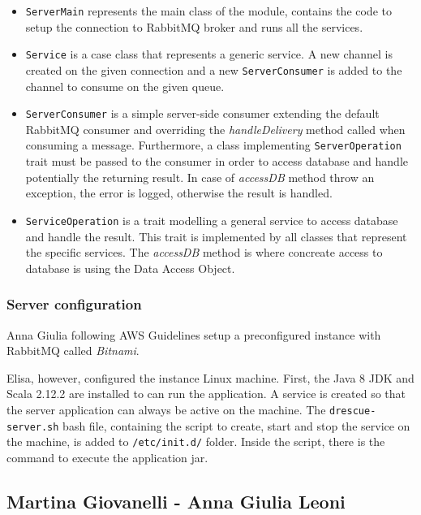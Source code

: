 \documentclass[a4paper,12pt]{report}
\begin{document}
\begin{itemize}
\item \texttt{ServerMain} represents the main class of the module, contains the code to setup the connection to RabbitMQ broker and runs all the services.
\item \texttt{Service} is a case class that represents a generic service. A new channel is created on the given connection and a new \texttt{ServerConsumer} is added to the channel to consume on the given queue.
\item \texttt{ServerConsumer} is a simple server-side consumer extending the default RabbitMQ consumer and overriding the \emph{handleDelivery} method called when consuming a message. Furthermore, a class implementing \texttt{ServerOperation} trait must be passed to the consumer in order to access database and handle potentially the returning result. In case of \emph{accessDB} method throw an exception, the error is logged, otherwise the result is handled. 
\item \texttt{ServiceOperation} is a trait modelling a general service to access database and handle the result. This trait is implemented by all classes that represent the specific services. The \emph{accessDB} method is where concreate access to database is using the Data Access Object.
\end{itemize}

\subsubsection{Server configuration}
Anna Giulia following AWS Guidelines setup a preconfigured instance with RabbitMQ called \emph{Bitnami}.

Elisa, however, configured the instance Linux machine. First, the Java 8 JDK and Scala 2.12.2 are installed to can run the application. A service is created so that the server application can always be active on the machine. The \texttt{drescue-server.sh} bash file, containing the script to create, start and stop the service on the machine, is added to \texttt{/etc/init.d/} folder. Inside the script, there is the command to execute the application jar.

\subsection{Martina Giovanelli - Anna Giulia Leoni}
\end{document}
